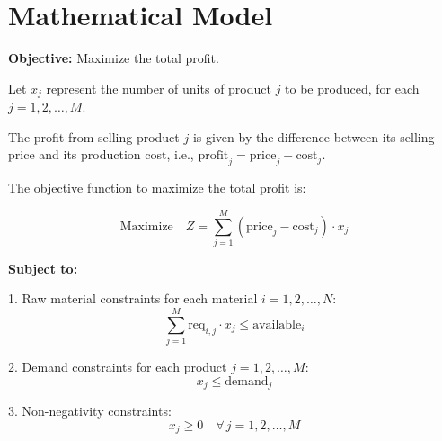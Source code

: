 \documentclass{article}
\begin{document}
\section*{Mathematical Model}

\textbf{Objective:} Maximize the total profit.

Let \( x_j \) represent the number of units of product \( j \) to be produced, for each \( j = 1, 2, \ldots, M \).

The profit from selling product \( j \) is given by the difference between its selling price and its production cost, i.e., \( \text{profit}_j = \text{price}_j - \text{cost}_j \).

The objective function to maximize the total profit is:

\[
\text{Maximize} \quad Z = \sum_{j=1}^{M} (\text{price}_j - \text{cost}_j) \cdot x_j
\]

\textbf{Subject to:}

1. Raw material constraints for each material \( i = 1, 2, \ldots, N \):
\[
\sum_{j=1}^{M} \text{req}_{i,j} \cdot x_j \leq \text{available}_i
\]

2. Demand constraints for each product \( j = 1, 2, \ldots, M \):
\[
x_j \leq \text{demand}_j
\]

3. Non-negativity constraints:
\[
x_j \geq 0 \quad \forall \, j = 1, 2, \ldots, M
\]
\end{document}
